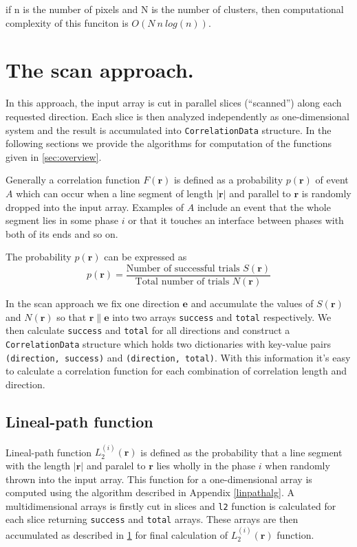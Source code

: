 \documentclass[reprint,amsmath,amssymb,aps,pre,showkeys,showpacs,nofootinbib]{revtex4-1}
\newcommand{\code}[1]{\colorbox{light-gray}{\texttt{#1}}}
\newcommand{\apref}[1]{Appendix \ref{#1}}
\begin{document}
if n is the number of pixels and N is the number of clusters, then computational complexity
of this funciton is $O(N\ n\ log(n))$.

\section{The scan approach.}
\label{sec:scan}
In this approach, the input array is cut in parallel slices (``scanned'') along
each requested direction. Each slice is then analyzed independently as
one-dimensional system and the result is accumulated into \code{CorrelationData}
structure. In the following sections we provide the algorithms for computation
of the functions given in \cref{sec:overview}.

Generally a correlation function $F(\bm{r})$ is defined as a probability
$p(\bm{r})$ of event $A$ which can occur when a line segment of length
$|\bm{r}|$ and parallel to $\bm{r}$ is randomly dropped into the input
array. Examples of $A$ include an event that the whole segment lies in some
phase $i$ or that it touches an interface between phases with both of its ends
and so on.

The probability $p(\bm{r})$ can be expressed as
\begin{equation}\label{eq:probability}
  p(\bm{r}) = \frac{\text{Number of successful trials $S(\bm{r})$}}
  {\text{Total number of trials $N(\bm{r})$}}
\end{equation}

In the scan approach we fix one direction $\bm{e}$ and accumulate the values of
$S(\bm{r})$ and $N(\bm{r})$ so that $\bm{r} \parallel \bm{e}$ into two arrays
\code{success} and \code{total} respectively. We then calculate \code{success}
and \code{total} for all directions and construct a \code{CorrelationData}
structure which holds two dictionaries with key-value pairs
\code{(direction, success)} and \code{(direction, total)}. With this information
it's easy to calculate a correlation function for each combination of
correlation length and direction.

\subsection{Lineal-path function}
Lineal-path function $L_2^{(i)}(\bm{r})$ is defined as the probability that a
line segment with the length $|\bm{r}|$ and paralel to $\bm{r}$ lies wholly in
the phase $i$ when randomly thrown into the input array. This function for a
one-dimensional array is computed using the algorithm described in
\apref{linpathalg}. A multidimensional arrays is firstly cut in slices and
\code{l2} function is calculated for each slice returning \code{success} and
\code{total} arrays. These arrays are then accumulated as described in
\cref{sec:scan} for final calculation of $L_2^{(i)}(\bm{r})$ function.
\end{document}
